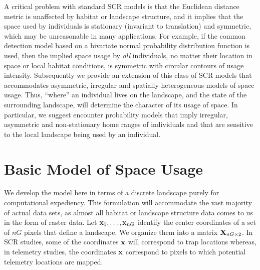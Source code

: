 \documentclass[12pt]{article}
\begin{document}
A critical problem with standard SCR models 
is that the Euclidean
distance metric is unaffected by habitat or landscape structure, and
it implies that the space used by individuals is stationary (invariant
to translation) and symmetric,
which may be unreasonable in many applications.  For example, if the
common detection model based on a bivariate normal probability
distribution function is used, then the implied space usage by {\it
  all} individuals, no matter their location in space or local habitat
conditions, is symmetric with circular contours of usage intensity.
Subsequently we provide an extension
of this class of SCR models that accommodates asymmetric, irregular
and spatially heterogeneous models of space usage. 
 Thus, ``where'' an individual lives on the landscape, and
the state of the surrounding landscape, will determine the character
of its usage of space. In particular, we suggest encounter probability
models that 
imply irregular, asymmetric and non-stationary home ranges of
individuals and that are sensitive to the local landscape being used
by an individual. 



\section{Basic Model of Space Usage}
\label{rsf.sec.rsfmodel}

We develop the model here in terms of a discrete landscape purely for
computational expediency. This formulation will accommodate the vast
majority of actual data sets, as 
almost all habitat or landscape structure data comes to us in the form
of raster data.  Let ${\bf x}_{1},\ldots,{\bf x}_{nG}$ identify the
center coordinates of a set of $nG$ pixels that define a landscape.
We organize them into a matrix ${\bf X}_{nG \times 2}$.  In SCR
studies, some of the coordinates ${\bf x}$ will correspond to trap
locations whereas, in telemetry studies, the coordinates ${\bf x}$
correspond to pixels to which potential telemetry locations are
mapped. 
\end{document}
